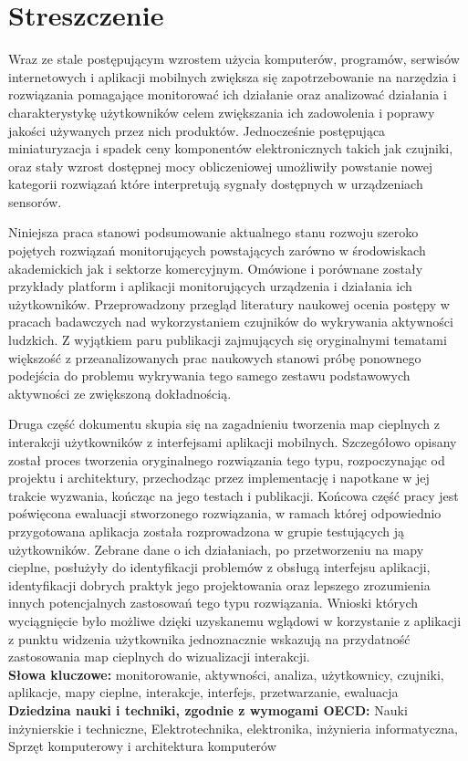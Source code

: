 \chapter*{Streszczenie}
Wraz ze stale postępującym wzrostem użycia komputerów, programów, serwisów internetowych i aplikacji mobilnych zwiększa się zapotrzebowanie na narzędzia i rozwiązania pomagające monitorować ich działanie oraz analizować działania i charakterystykę użytkowników celem zwiększania ich zadowolenia i poprawy jakości używanych przez nich produktów. Jednocześnie postępująca miniaturyzacja i spadek ceny komponentów elektronicznych takich jak czujniki, oraz stały wzrost dostępnej mocy obliczeniowej umożliwiły powstanie nowej kategorii rozwiązań które interpretują sygnały dostępnych w urządzeniach sensorów. 

Niniejsza praca stanowi podsumowanie aktualnego stanu rozwoju szeroko pojętych rozwiązań monitorujących powstających zarówno w środowiskach akademickich jak i sektorze komercyjnym. Omówione i porównane zostały przykłady platform i aplikacji monitorujących urządzenia i działania ich użytkowników. Przeprowadzony przegląd literatury naukowej ocenia postępy w pracach badawczych nad wykorzystaniem czujników do wykrywania aktywności ludzkich. Z wyjątkiem paru publikacji zajmujących się oryginalnymi tematami większość z przeanalizowanych prac naukowych stanowi próbę ponownego podejścia do problemu wykrywania tego samego zestawu podstawowych aktywności ze zwiększoną dokładnością. 

Druga część dokumentu skupia się na zagadnieniu tworzenia map cieplnych z interakcji użytkowników z interfejsami aplikacji mobilnych. Szczegółowo opisany został proces tworzenia oryginalnego rozwiązania tego typu, rozpoczynając od projektu i architektury, przechodząc przez implementację i napotkane w jej trakcie wyzwania, kończąc na jego testach i publikacji. Końcowa część pracy jest poświęcona ewaluacji stworzonego rozwiązania, w ramach której odpowiednio przygotowana aplikacja została rozprowadzona w grupie testujących ją użytkowników. Zebrane dane o ich działaniach, po przetworzeniu na mapy cieplne, posłużyły do identyfikacji problemów z obsługą interfejsu aplikacji, identyfikacji dobrych praktyk jego projektowania oraz lepszego zrozumienia innych potencjalnych zastosowań tego typu rozwiązania. Wnioski których wyciągnięcie było możliwe dzięki uzyskanemu wglądowi w korzystanie z aplikacji z punktu widzenia użytkownika jednoznacznie wskazują na przydatność zastosowania map cieplnych do wizualizacji interakcji. \\

\noindent\textbf{Słowa kluczowe:} monitorowanie, aktywności, analiza, użytkownicy, czujniki, aplikacje, mapy cieplne, interakcje, interfejs, przetwarzanie, ewaluacja \\

\noindent\textbf{Dziedzina nauki i techniki, zgodnie z wymogami OECD:} Nauki inżynierskie i techniczne, Elektrotechnika, elektronika, inżynieria informatyczna, Sprzęt komputerowy i architektura komputerów
